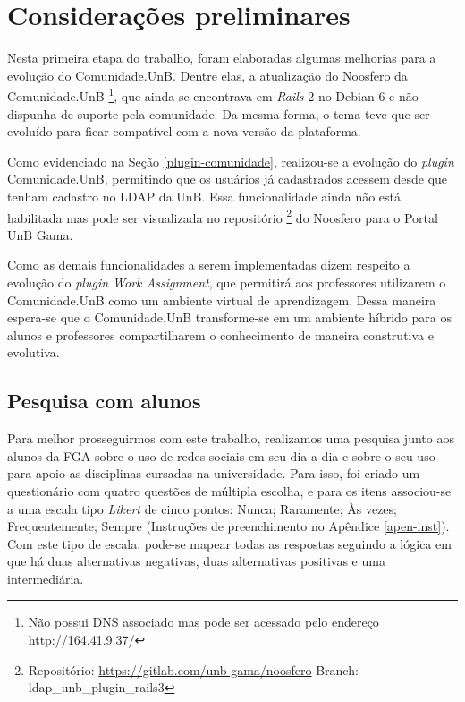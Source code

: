 \chapter{Considerações preliminares}
\label{consideracoes-preliminares}

Nesta primeira etapa do trabalho, foram elaboradas algumas melhorias para a evolução do Comunidade.UnB. Dentre elas, a atualização do Noosfero da Comunidade.UnB \footnote{Não possui DNS associado mas pode ser acessado pelo endereço \url{http://164.41.9.37/}}, que ainda se encontrava em \textit{Rails} 2 no Debian 6 e não dispunha de suporte pela comunidade. Da mesma forma, o tema teve que ser evoluído para ficar compatível com a nova versão da plataforma.

Como evidenciado na Seção \ref{plugin-comunidade}, realizou-se a evolução do \textit{plugin} Comunidade.UnB, permitindo que os usuários já cadastrados acessem desde que tenham cadastro no LDAP da UnB. Essa funcionalidade ainda não está habilitada mas pode ser visualizada no repositório \footnote{Repositório: \url{https://gitlab.com/unb-gama/noosfero} Branch: ldap\_unb\_plugin\_rails3 } do Noosfero para o Portal UnB Gama.

Como as demais funcionalidades a serem implementadas dizem respeito a evolução do \textit{plugin Work Assignment}, que permitirá aos professores utilizarem o Comunidade.UnB como um ambiente virtual de aprendizagem. Dessa maneira espera-se que o Comunidade.UnB transforme-se em um ambiente híbrido para os alunos e professores compartilharem o conhecimento de maneira construtiva e evolutiva.

\section{Pesquisa com alunos}
\label{pesquisa-alunos}

Para melhor prosseguirmos com este trabalho, realizamos uma pesquisa junto aos alunos da FGA sobre o uso de redes sociais em seu dia a dia e sobre o seu uso para apoio as disciplinas cursadas na universidade. Para isso, foi criado um questionário com quatro questões de múltipla escolha, e para os itens associou-se a uma escala tipo \emph{Likert} de cinco pontos: Nunca; Raramente; Às vezes; Frequentemente; Sempre (Instruções de preenchimento no Apêndice \ref{apen-inst}). Com este tipo de escala, pode-se mapear todas as respostas seguindo a lógica em que há duas alternativas negativas, duas alternativas positivas e uma intermediária.

